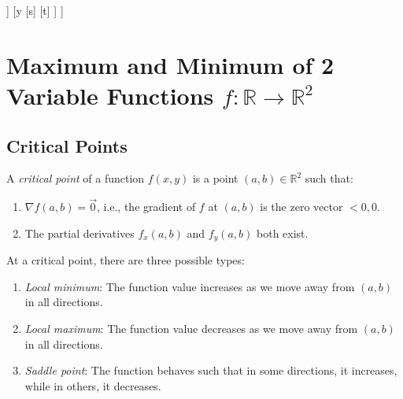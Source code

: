 \documentclass{report}
\begin{document}
\begin{center}
	\begin{forest}
		[z
				[x
						[s]
						[t]
				]
				[y
						[s]
						[t]
				]
		]
	\end{forest}
\end{center}


\section{Maximum and Minimum of 2 Variable Functions $f:\mathbb{R} \rightarrow \mathbb{R}^2$ }

\subsection{Critical Points}

A \emph{critical point} of a function \( f(x, y) \) is a point \( (a, b) \in \mathbb{R}^2 \) such that:
\begin{enumerate}
	\item \( \nabla f(a, b) = \vec{0} \), i.e., the gradient of \( f \) at \( (a, b) \) is the zero vector $<0,0$.
	\item The partial derivatives \( f_x(a, b) \) and \( f_y(a, b) \) both exist.
\end{enumerate}

At a critical point, there are three possible types:
\begin{enumerate}
	\item \emph{Local minimum}: The function value increases as we move away from \( (a, b) \) in all directions.
	\item \emph{Local maximum}: The function value decreases as we move away from \( (a, b) \) in all directions.
	\item \emph{Saddle point}: The function behaves such that in some directions, it increases, while in others, it decreases.
\end{enumerate}
\end{document}
